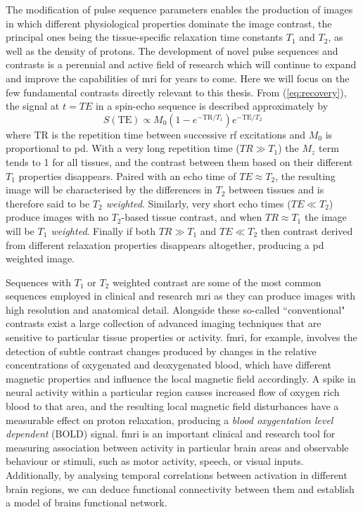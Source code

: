 The modification of pulse sequence parameters enables the production of images in which different physiological properties dominate the image contrast, the principal ones being the tissue-specific relaxation time constants $T_1$ and $T_2$, as well as the density of protons.
The development of novel pulse sequences and contrasts is a perennial and active field of research which will continue to expand and improve the capabilities of \gls{mri} for years to come.
Here we will focus on the few fundamental contrasts directly relevant to this thesis.
From (\ref{eq:recovery}), the signal at $t=TE$ in a spin-echo sequence is described approximately by
\begin{equation}
  S(\text{TE}) \propto M_0 (1-e^{-\text{TR}/T_1})e^{-\text{TE}/T_2}
\end{equation}
where TR is the repetition time between successive \gls{rf} excitations and $M_0$ is proportional to \gls{pd}.
With a very long repetition time ($TR\gg T_1$) the $M_z$ term tends to 1 for all tissues, and the contrast between them based on their different $T_1$ properties disappears.
Paired with an echo time of $TE\approx T_2$, the resulting image will be characterised by the differences in $T_2$ between tissues and is therefore said to be \textit{$T_2$ weighted}.
Similarly, very short echo times ($TE\ll T_2$) produce images with no $T_2$-based tissue contrast, and when $TR\approx T_1$ the image will be \textit{$T_1$ weighted}.
Finally if both $TR\gg T_1$ and $TE\ll T_2$ then contrast derived from different relaxation properties disappears altogether, producing a \gls{pd} weighted image.

Sequences with $T_1$ or $T_2$ weighted contrast are some of the most common sequences employed in clinical and research \gls{mri} as they can produce images with high resolution and anatomical detail.
Alongside these so-called ``conventional" contrasts exist a large collection of advanced imaging techniques that are sensitive to particular tissue properties or activity.
\Gls{fmri}, for example, involves the detection of subtle contrast changes produced by changes in the relative concentrations of oxygenated and deoxygenated blood, which have different magnetic properties and influence the local magnetic field accordingly.
A spike in neural activity within a particular region causes increased flow of oxygen rich blood to that area, and the resulting local magnetic field disturbances have a measurable effect on proton relaxation, producing a \textit{blood oxygentation level dependent} (BOLD) signal.
\gls{fmri} is an important clinical and research tool for measuring association between activity in particular brain areas and observable behaviour or stimuli, such as motor activity, speech, or visual inputs.
Additionally, by analysing temporal correlations between activation in different brain regions, we can deduce functional connectivity between them and establish a model of brains functional network.


